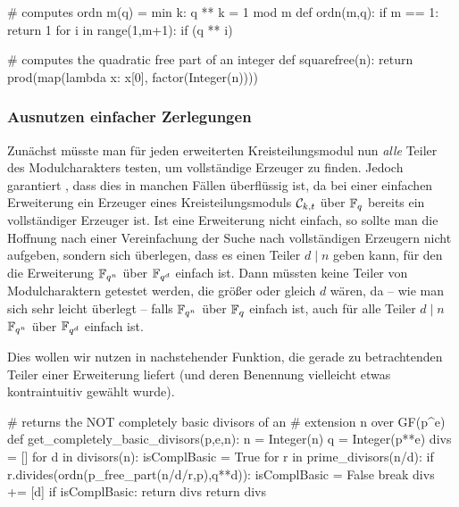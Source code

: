 \begin{sagecode}[caption={Aus \url{../Sage/enumeratePCNs.spyx}},
  firstnumber=538]
# computes ordn m(q) = min{ k: q ** k = 1 mod m }
def ordn(m,q):
    if m == 1: return 1
    for i in range(1,m+1):
        if (q ** i)%
\end{sagecode}  

\begin{sagecode}[caption={Aus \url{../Sage/enumeratePCNs.spyx}},
  firstnumber=534]
# computes the quadratic free part of an integer
def squarefree(n):
    return prod(map(lambda x: x[0], factor(Integer(n))))
\end{sagecode}  


\subsubsection{Ausnutzen einfacher Zerlegungen}

Zunächst müsste man für jeden erweiterten Kreisteilungsmodul
nun \emph{alle} Teiler des Modulcharakters testen, um vollständige Erzeuger zu
finden. Jedoch garantiert , dass dies in
manchen Fällen überflüssig ist, da bei einer einfachen Erweiterung ein Erzeuger
eines Kreisteilungsmoduls $\mathcal{C}_{k,t}$ über $\mathbb{F}_q$ bereits ein vollständiger
Erzeuger ist. Ist eine Erweiterung nicht einfach, so sollte man die Hoffnung
nach einer Vereinfachung der Suche nach vollständigen Erzeugern nicht aufgeben,
sondern sich überlegen, dass es einen Teiler $d \mid n$ geben kann, für den
die Erweiterung $\mathbb{F}_{q^n}$ über $\mathbb{F}_{q^d}$ einfach ist. Dann müssten keine
Teiler von Modulcharaktern getestet werden, die größer oder gleich $d$ wären, 
da -- wie man sich sehr leicht überlegt -- falls $\mathbb{F}_{q^n}$ über $\mathbb{F}_q$ einfach
ist, auch für alle Teiler $d\mid n$ $\mathbb{F}_{q^n}$ über $\mathbb{F}_{q^d}$ einfach ist.

Dies wollen wir nutzen in nachstehender Funktion, die
gerade zu betrachtenden Teiler einer Erweiterung liefert 
(und deren Benennung vielleicht etwas kontraintuitiv gewählt wurde).

\begin{sagecode}[caption={Aus \url{../Sage/enumeratePCNs.spyx}},
  firstnumber=594, label=lst:get_completely_basic_divisors]
# returns the NOT completely basic divisors of an 
# extension n over GF(p^e)
def get_completely_basic_divisors(p,e,n):
    n = Integer(n)
    q = Integer(p**e)
    divs = []
    for d in divisors(n):
        isComplBasic = True
        for r in prime_divisors(n/d):
            if r.divides(ordn(p_free_part(n/d/r,p),q**d)):
                isComplBasic = False
                break
        divs += [d]
        if isComplBasic: return divs
    return divs
\end{sagecode}

